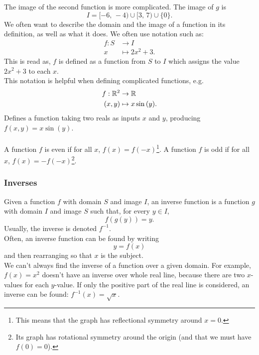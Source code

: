 \documentclass[10pt, a4paper]{article}
\begin{document}
The image of the second function is more complicated. The image of $g$ is
\[
I = [-6,\,-4) \cup [3,\,7) \cup \{0\}.
\]
We often want to describe the domain and the image of a function in its definition, as well as what it does. We often use notation such as:
\begin{align*}
f : S &\rightarrow I \\
x &\mapsto 2x ^ 2 + 3.
\end{align*}
This is read as, $f$ is defined as a function from $S$ to $I$ which assigns the value $2x ^ 2 + 3$ to each $x$. \\
This notation is helpful when defining complicated functions, e.g.
\begin{align*}
f : \mathbb{R} ^ 2 &\rightarrow \mathbb{R} \\
(x, y) &\mapsto x\sin{(y)}.
\end{align*}
Defines a function taking two reals as inputs $x$ and $y$, producing $f(x, y) = x\sin{(y)}$. \\
\\
A function $f$ is even if for all $x$, $f(x) = f(-x)$\footnote{This means that the graph has reflectional symmetry around $x = 0$.}. A function $f$ is odd if for all $x$, $f(x) = -f(-x)$\footnote{Its graph has rotational symmetry around the origin (and that we must have $f(0) = 0$).}.


\subsubsection{Inverses}
Given a function $f$ with domain $S$ and image $I$, an inverse function is a function $g$ with domain $I$ and image $S$ such that, for every $y \in I$,
\[
f(g(y)) = y.
\]
Usually, the inverse is denoted $f ^ {-1}$. \\
Often, an inverse function can be found by writing
\[
y = f(x)
\]
and then rearranging so that $x$ is the subject. \\
We can't always find the inverse of a function over a given domain. For example, $f(x) = x ^ 2$ doesn't have an inverse over whole real line, because there are two $x$-values for each $y$-value. If only the positive part of the real line is considered, an inverse can be found: $f ^ {-1}(x) = \sqrt{x}$.
\end{document}
